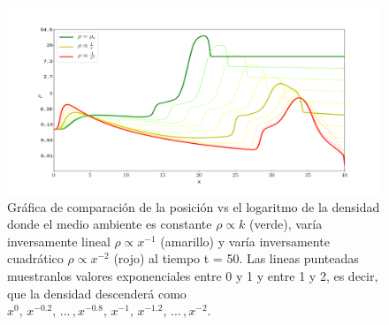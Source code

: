 \documentclass[12pt,a4paper]{book}
\begin{document}
\begin{figure}
  \centering
    \includegraphics[width=1\textwidth]{./Figuras/jet/perfiles/densidades_comparacion.png}
  \caption{Gráfica de comparación de la posición vs el logaritmo de la densidad 
  donde el medio ambiente es constante $\rho \varpropto k$ (verde), varía inversamente lineal
  $\rho \varpropto x^{-1}$ (amarillo) y varía inversamente cuadrático $\rho \varpropto x^{-2}$ (rojo)
  al tiempo t = 50.  Las lineas punteadas muestranlos valores exponenciales entre 0 y 1 y entre 1 y 2,
  es decir, que la densidad descenderá como $x^0, \, x^{-0.2}, \, . . . \,  ,x^{-0.8} , \, x^{-1}  , \, x^{-1.2}
  , \, . . . \,  , x^{-2}$.}\label{fig:perfiles_comparacion_jet}
\end{figure}








\end{document}
